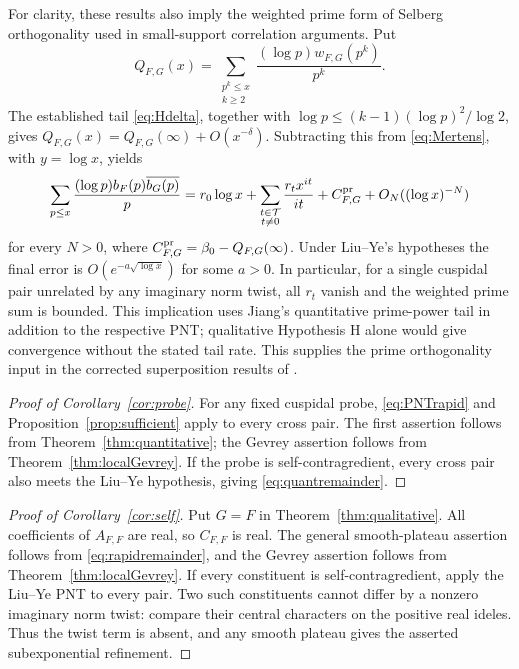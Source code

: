 \documentclass[11pt]{article}
\numberwithin{equation}{section}
\theoremstyle{remark}
\begin{document}
For clarity, these results also imply the weighted prime form of
Selberg orthogonality used in small-support correlation arguments.
Put
\[
 Q_{F,G}(x)=\sum_{\substack{p^k\le x\\k\ge2}}
       \frac{(\log p)w_{F,G}(p^k)}{p^k}.
\]
The established tail \eqref{eq:Hdelta}, together with
$\log p\le (k-1)(\log p)^2/\log2$, gives
$Q_{F,G}(x)=Q_{F,G}(\infty)+O(x^{-\delta})$.
Subtracting this from \eqref{eq:Mertens}, with $y=\log x$, yields
\begin{equation}\label{eq:primeMertens}
 \sum_{p\le x}\frac{(\log p)b_F(p)\overline{b_G(p)}}p
 =r_0\log x+\sum_{\substack{t\in\mathcal T\\t\ne0}}
      \frac{r_tx^{it}}{it}+C^{\rm pr}_{F,G}
      +O_N((\log x)^{-N})
\end{equation}
for every $N>0$, where $C^{\rm pr}_{F,G}=\beta_0-Q_{F,G}(\infty)$.
Under Liu--Ye's hypotheses the final error is
$O(e^{-a\sqrt{\log x}})$ for some $a>0$.
In particular, for a single cuspidal pair unrelated by any imaginary
norm twist, all $r_t$ vanish and the weighted prime sum is bounded.
This implication uses Jiang's quantitative prime-power tail in
addition to the respective PNT; qualitative Hypothesis H alone
would give convergence without the stated tail rate. This supplies
the prime orthogonality input in the corrected superposition results
of \cite{LY02,YForumCorr}.

\begin{proof}[Proof of Corollary~\ref{cor:probe}]
For any fixed cuspidal probe, \eqref{eq:PNTrapid} and
Proposition~\ref{prop:sufficient} apply to every cross pair. The
first assertion follows from Theorem~\ref{thm:quantitative}; the
Gevrey assertion follows from Theorem~\ref{thm:localGevrey}.
If the probe is self-contragredient, every cross pair also meets
the Liu--Ye hypothesis, giving \eqref{eq:quantremainder}.
\end{proof}

\begin{proof}[Proof of Corollary~\ref{cor:self}]
Put $G=F$ in Theorem~\ref{thm:qualitative}. All coefficients of
$A_{F,F}$ are real, so $C_{F,F}$ is real. The general smooth-plateau
assertion follows from \eqref{eq:rapidremainder}, and the Gevrey
assertion follows from Theorem~\ref{thm:localGevrey}. If every
constituent is self-contragredient, apply the Liu--Ye PNT to every
pair. Two such constituents cannot differ by a nonzero imaginary
norm twist: compare their central characters on the positive real
ideles. Thus the twist term is absent, and any smooth plateau gives
the asserted subexponential refinement.
\end{proof}
\end{document}
